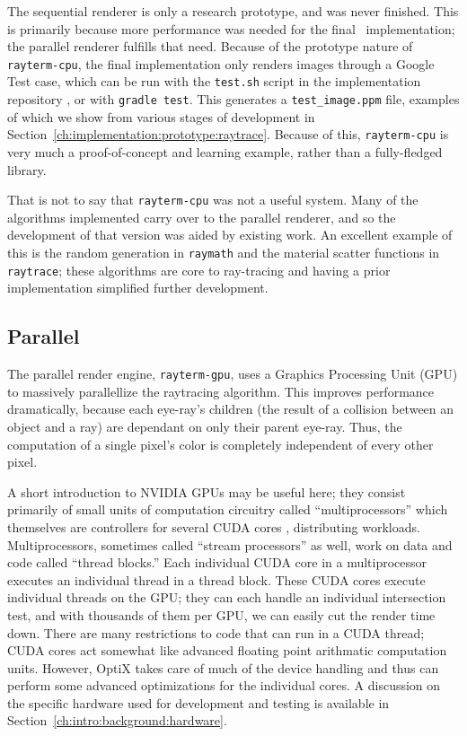  \label{ch:methods:renderer:sequential:outcome}

The sequential renderer is only a research prototype, and was never finished.
This is primarily because more performance was needed for the final \name\ implementation; the parallel renderer fulfills that need.
Because of the prototype nature of \texttt{rayterm-cpu}, the final implementation only renders images through a Google Test \cite{googletest} case, which can be run with the \texttt{test.sh} script in the implementation repository \cite{raytermCpuImpl}, or with \texttt{gradle test}.
This generates a \texttt{test\_image.ppm} file, examples of which we show from various stages of development in Section~\ref{ch:implementation:prototype:raytrace}.
Because of this, \texttt{rayterm-cpu} is very much a proof-of-concept and learning example, rather than a fully-fledged library.

That is not to say that \texttt{rayterm-cpu} was not a useful system.
Many of the algorithms implemented carry over to the parallel renderer, and so the development of that version was aided by existing work.
An excellent example of this is the random generation in \texttt{raymath} and the material scatter functions in \texttt{raytrace}; these algorithms are core to ray-tracing and having a prior implementation simplified further development.

\subsection{Parallel} \label{ch:methods:renderer:parallel}

The parallel render engine, \texttt{rayterm-gpu}, uses a Graphics Processing Unit (GPU) to massively parallellize the raytracing algorithm.
This improves performance dramatically, because each eye-ray's children (the result of a collision between an object and a ray) are dependant on only their parent eye-ray.
Thus, the computation of a single pixel's color is completely independent of every other pixel.

A short introduction to NVIDIA GPUs may be useful here; they consist primarily of small units of computation circuitry called ``multiprocessors'' which themselves are controllers for several CUDA cores \cite{fermi2009nvidia}, distributing workloads.
Multiprocessors, sometimes called ``stream processors'' as well, work on data and code called ``thread blocks.''
Each individual CUDA core in a multiprocessor executes an individual thread in a thread block.
These CUDA cores execute individual threads on the GPU; they can each handle an individual intersection test, and with thousands of them per GPU, we can easily cut the render time down.
There are many restrictions to code that can run in a CUDA thread; CUDA cores act somewhat like advanced floating point arithmatic computation units.
However, OptiX takes care of much of the device handling and thus can perform some advanced optimizations for the individual cores.
A discussion on the specific hardware used for development and testing is available in Section~\ref{ch:intro:background:hardware}.

